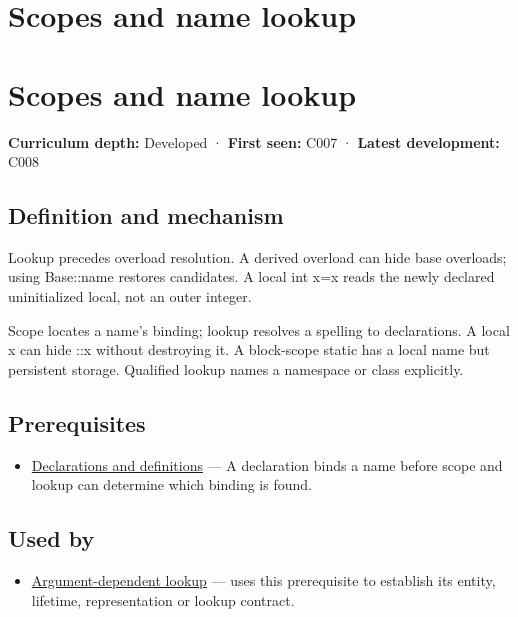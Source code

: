 \hypertarget{appendix-b12b31759da1}{}
\section*{Scopes and name lookup}
\section{Scopes and name lookup}\label{appendix-b12b31759da1-scopes-and-name-lookup}

\textbf{Curriculum depth:} Developed · \textbf{First seen:} C007 · \textbf{Latest development:} C008

\subsection{Definition and mechanism}\label{appendix-b12b31759da1-definition-and-mechanism}

Lookup precedes overload resolution. A derived overload can hide base overloads; using Base::name restores candidates. A local int x=x reads the newly declared uninitialized local, not an outer integer.

Scope locates a name's binding; lookup resolves a spelling to declarations. A local x can hide ::x without destroying it. A block-scope static has a local name but persistent storage. Qualified lookup names a namespace or class explicitly.

\subsection{Prerequisites}\label{appendix-b12b31759da1-prerequisites}

\begin{itemize}
\tightlist
\item
  \hyperref[appendix-2e4d494c2d94]{Declarations and definitions} --- A declaration binds a name before scope and lookup can determine which binding is found.
\end{itemize}

\subsection{Used by}\label{appendix-b12b31759da1-used-by}

\begin{itemize}
\tightlist
\item
  \hyperref[appendix-7863714aa97f]{Argument-dependent lookup} --- uses this prerequisite to establish its entity, lifetime, representation or lookup contract.
\end{itemize}


